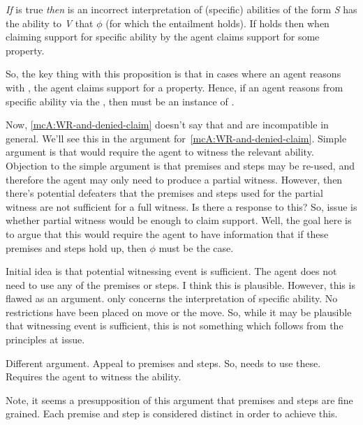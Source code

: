 \begin{note}[Proposition]
  \begin{proposition}\label{mcA:WR-and-denied-claim}
    \emph{If} \ESU{} is true \emph{then} \WR{} is an incorrect interpretation of (specific) abilities of the form \emph{S} has the ability to \emph{V} that \(\phi\) (for which the \aben{} entailment holds).
    {
      \color{red}
      If \ESU{} holds then when claiming support for specific ability by \gsi{} the agent claims support for some property.
    }
  \end{proposition}

  So, the key thing with this proposition is that in cases where an agent reasons with \gsi{-}, the agent claims support for a property.
  Hence, if an agent reasons from specific ability via the \aben{}, then must be an instance of \AR{}.

  Now, \autoref{mcA:WR-and-denied-claim} doesn't say that \ESU{} and \WR{} are incompatible in general.
  We'll see this in the argument for~\autoref{mcA:WR-and-denied-claim}.
  {
    \color{red}
    Simple argument is that \ESU{} would require the agent to witness the relevant ability.
    Objection to the simple argument is that premises and steps may be re-used, and therefore the agent may only need to produce a partial witness.
    However, then there's potential defeaters that the premises and steps used for the partial witness are not sufficient for a full witness.
    Is there a response to this?
    So, issue is whether partial witness would be enough to claim support.
    Well, the goal here is to argue that this would require the agent to have information that if these premises and steps hold up, then \(\phi\) must be the case.
  }


  {
    \color{green}
    Initial idea is that potential witnessing event is sufficient.
    The agent does not need to use any of the premises or steps.
    I think this is plausible.
    However, this is flawed as an argument.
    \WR{} only concerns the interpretation of specific ability.
    No restrictions have been placed on \gsi{} move or the \aben{} move.
    So, while it may be plausible that witnessing event is sufficient, this is not something which follows from the principles at issue.

    Different argument.
    Appeal to premises and steps.
    So, needs to use these.
    Requires the agent to witness the ability.

    Note, it seems a presupposition of this argument that premises and steps are fine grained.
    Each premise and step is considered distinct in order to achieve this.

}
\end{note}
